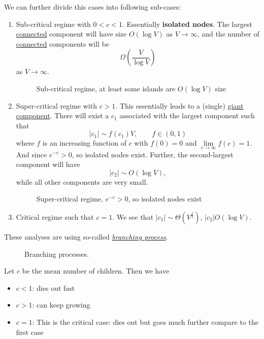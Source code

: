 \begin{remark}
	We can further divide this cases into following sub-cases:
	\begin{enumerate}
		\item Sub-critical regime with \(0<c<1\). Essentially \textbf{isolated nodes}.
		      The largest \hyperref[def:connected]{connected} component will have size \(O(\log V)\) as \(V\to \infty \), and the
		      number of \hyperref[def:connected]{connected} components will be
		      \[
			      \Omega\left(\frac{V}{\log V}\right)
		      \]
		      as \(V\to \infty \).
		      \begin{figure}[H]
			      \centering
			      \caption{Sub-critical regime, at least some islands are \(O(\log V)\) size}
			      \label{fig:sub-critical-regime}
		      \end{figure}
		\item Super-critical regime with \(c>1\). This essentially leads to a (single) \hyperref[def:giant-component]{giant component}.
		      There will exist a \(c_1\) associated with the largest component such that
		      \[
			      \left\vert c_1 \right\vert \sim f(c_1)V, \qquad f\in(0, 1)
		      \]
		      where \(f\) is an increasing function of \(c\) with \(f(0) = 0\) and \(\lim\limits_{c\to \infty }f(c) = 1\).
		      And since \(e^{-c}>0\), so isolated nodes exist. Further, the second-largest component will have
		      \[
			      \left\vert c_2 \right\vert \sim O(\log V),
		      \]
		      while all other components are very small.
		      \begin{figure}[H]
			      \centering
			      \caption{Super-critical regime, \(e^{-c}>0\), so isolated nodes exist}
			      \label{fig:super-critical-regime}
		      \end{figure}
		\item Critical regime such that \(c = 1\). We see that \(\left\vert c_1 \right\vert \sim \Theta(V^{\frac{2}{3}})\), \(\left\vert c_2 \right\vert O(\log V)\).
	\end{enumerate}
	\begin{remark}
		These analyses are using so-called \href{https://en.wikipedia.org/wiki/Branching_process}{\emph{branching process}}.
		\begin{figure}[H]
			\centering
			\caption{Branching processes.}
			\label{fig:branching-processes}
		\end{figure}

		Let \(c\) be the mean number of children. Then we have
		\begin{itemize}
			\item \(c<1\): dies out fast
			\item \(c>1\): can keep growing
			\item \(c=1\): This is the critical case: dies out but goes much further compare to the first case
		\end{itemize}
	\end{remark}
\end{remark}

